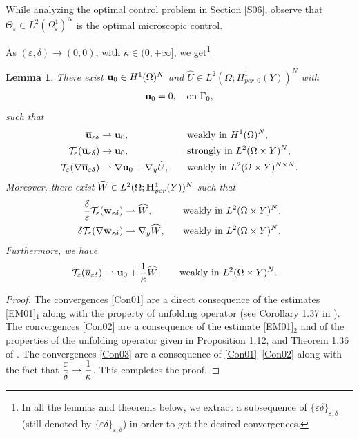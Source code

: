 \documentclass[11pt,a4paper]{article}
\numberwithin{equation}{section}
\newcommand\ds{\displaystyle}
\def\wo{\overline}
\def\O{\Omega}
\def\d{\delta}
\def\e{\varepsilon}
\def\Te{{\cal T}_\varepsilon}
\def\ds{\displaystyle}
\def\ed{{\varepsilon\delta}}
\def\wh{\widehat }
\def\X{\times }
\def\Gu{{\bf u}}
\def\Gw{{\bf w}}
\def\GH{{\bf H}}
\newtheorem{lemma}[theorem]{Lemma}
\begin{document}
While analyzing the optimal control problem in Section \ref{S06}, observe that $ \Theta_\e\in L^2(\O_\e^1)^N$ is the optimal microscopic control.

As $(\e,\d)\to (0,0)$, with $\kappa\in(0,+\infty]$, we get\footnote{In all the lemmas and theorems below, we extract  a subsequence  of $\{\ed\}_{\e,\d}$ (still denoted by $\{\ed\}_{\e,\d}$)  in order to get the desired convergences.}
\begin{lemma}\label{L04}
	There exist $\Gu_0\in H^1(\O)^N$ and $\wh U\in L^2(\O; H^1_{per,0}(Y))^N$ with
	$$\Gu_0=0,\quad \text{on $\Gamma_0$},$$
	such that
	\begin{equation}\label{Con01}
		\begin{aligned}
			\wo\Gu_\ed &\rightharpoonup \Gu_0,\quad&&\text{weakly in $H^1(\O)^N$},\\
			\Te(\wo\Gu_\ed)&\to \Gu_0,\quad &&\text{strongly in $L^2(\O\X Y)^N$},\\
			\Te(\nabla \wo\Gu_\ed) &\rightharpoonup \nabla \Gu_0+\nabla_y\wh U,\quad &&\text{weakly in $L^2(\O\X Y)^{N\X N}$}.
		\end{aligned}
	\end{equation}
	Moreover,
	there exist $\wh W\in L^2(\O; \GH^1_{per}(Y))^N$ such that
	\begin{equation}\label{Con02}
		\begin{aligned}
			{\d\over \e}\Te(\wo\Gw_\ed) &\rightharpoonup \wh W,\quad&&\text{weakly in $L^2(\O\X Y)^N$},\\
			\d\Te(\nabla \wo\Gw_\ed) &\rightharpoonup \nabla_y\wh W,\quad&&\text{weakly in $L^2(\O\X Y)^N$}.
		\end{aligned}
	\end{equation}
	Furthermore, we have
	\begin{equation}\label{Con03}
		\begin{aligned}
			\Te(\wo u_\ed) &\rightharpoonup \Gu_0+{1\over \kappa}\wh W,\quad&&\text{weakly in $L^2(\O\X Y)^N$}.
		\end{aligned}
	\end{equation}
\end{lemma}
\begin{proof}
	The convergences \eqref{Con01} are a direct consequence of the estimates \eqref{EM01}$_1$ along with the property of unfolding operator (see Corollary 1.37 in \cite{CDG}). The convergences \eqref{Con02} are a consequence of the estimate \eqref{EM01}$_2$ and of the properties of the unfolding operator given in Proposition 1.12, and Theorem 1.36 of \cite{CDG}. The convergences \eqref{Con03} are a consequence of \eqref{Con01}--\eqref{Con02} along with the fact that $\ds{\e\over \d} \to \ds{1\over \kappa}$.    This completes the proof.
\end{proof}
\end{document}
